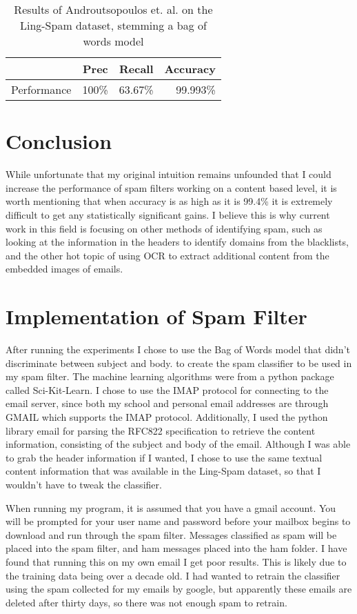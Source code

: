 \documentclass[12pt]{amsart}
\begin{document}
\begin{table}[h]
\centering
\begin{tabular}{| l | r | r | r |}
	\hline
	& Prec & Recall & Accuracy \\
	\hline
	Performance & 100\% & 63.67\% & 99.993\% \\
	\hline
\end{tabular}
\caption{Results of Androutsopoulos et. al. on the Ling-Spam dataset, stemming a bag of words model}
\label{tab:lingspam}
\end{table}

\section{Conclusion}
While unfortunate that my original intuition remains unfounded that I could increase the performance of spam filters working on a content based level, it is worth mentioning that when accuracy is as high as it is 99.4\% it is extremely difficult to get any statistically significant gains.  I believe this is why current work in this field is focusing on other methods of identifying spam, such as looking at the information in the headers to identify domains from the blacklists, and the other hot topic of using OCR to extract additional content from the embedded images of emails.

\section{Implementation of Spam Filter}

	After running the experiments I chose to use the Bag of Words model that didn't discriminate between subject and body. to create the spam classifier to be used in my spam filter.  The machine learning algorithms were from a python package called Sci-Kit-Learn\cite{sklearn}.  I chose to use the IMAP protocol for connecting to the email server, since both my school and personal email addresses are through GMAIL which supports the IMAP protocol.  Additionally, I used the python library email for parsing the RFC822 specification to retrieve the content information, consisting of the subject and body of the email.  Although I was able to grab the header information if I wanted, I chose to use the same textual content information that was available in the Ling-Spam dataset, so that I wouldn't have to tweak the classifier.
	
	When running my program, it is assumed that you have a gmail account.  You will be prompted for your user name and password before your mailbox begins to download and run through the spam filter.  Messages classified as spam will be placed into the spam filter, and ham messages placed into the ham folder.  I have found that running this on my own email I get poor results.  This is likely due to the training data being over a decade old.  I had wanted to retrain the classifier using the spam collected  for my emails by google, but apparently these emails are deleted after thirty days, so there was not enough spam to retrain.
\end{document}
